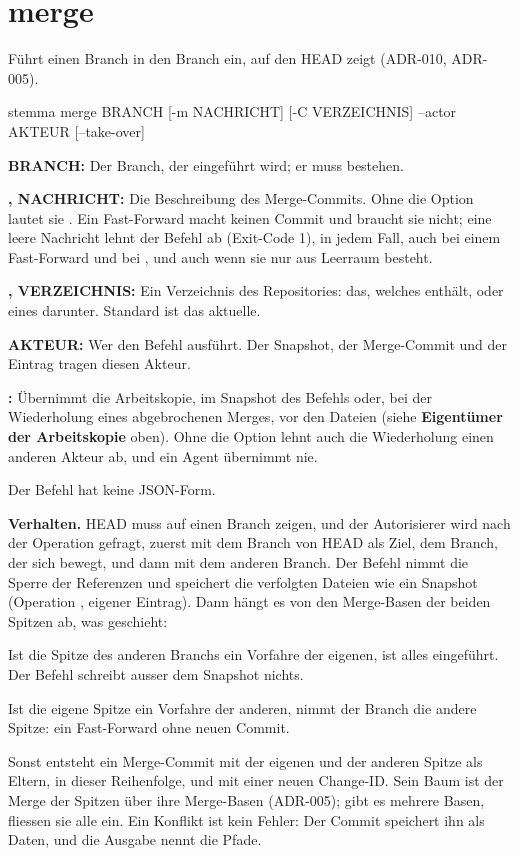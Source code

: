 \section{merge}

Führt einen Branch in den Branch ein, auf den HEAD zeigt (ADR-010, ADR-005).

\starttyping
stemma merge BRANCH [-m NACHRICHT] [-C VERZEICHNIS] --actor AKTEUR [--take-over]
\stoptyping

\startitemize
\item {\bf BRANCH:} Der Branch, der eingeführt wird; er muss bestehen.
\item {\bf {},  NACHRICHT:} Die Beschreibung des Merge-Commits.
Ohne die Option lautet sie .
Ein Fast-Forward macht keinen Commit und braucht sie nicht; eine leere Nachricht lehnt der Befehl
ab (Exit-Code 1), in jedem Fall, auch bei einem Fast-Forward und bei ,
und auch wenn sie nur aus Leerraum besteht.
\item {\bf {},  VERZEICHNIS:} Ein Verzeichnis des Repositories:
das, welches  enthält, oder eines darunter. Standard ist das aktuelle.
\item {\bf {} AKTEUR:} Wer den Befehl ausführt. Der Snapshot, der Merge-Commit und
der Eintrag tragen diesen Akteur.
\item {\bf {}:} Übernimmt die Arbeitskopie, im Snapshot des Befehls oder,
bei der Wiederholung eines abgebrochenen Merges, vor den Dateien
(siehe {\bf Eigentümer der Arbeitskopie} oben).
Ohne die Option lehnt auch die Wiederholung einen anderen Akteur ab, und ein Agent übernimmt nie.
\stopitemize

Der Befehl hat keine JSON-Form.

{\bf Verhalten.} HEAD muss auf einen Branch zeigen, und der Autorisierer wird nach der Operation
 gefragt, zuerst mit dem Branch von HEAD als Ziel, dem Branch, der sich bewegt,
und dann mit dem anderen Branch.
Der Befehl nimmt die Sperre der Referenzen und speichert die verfolgten Dateien wie ein Snapshot
(Operation , eigener Eintrag).
Dann hängt es von den Merge-Basen der beiden Spitzen ab, was geschieht:

\startitemize
\item Ist die Spitze des anderen Branchs ein Vorfahre der eigenen, ist alles eingeführt.
Der Befehl schreibt ausser dem Snapshot nichts.
\item Ist die eigene Spitze ein Vorfahre der anderen, nimmt der Branch die andere Spitze:
ein Fast-Forward ohne neuen Commit.
\item Sonst entsteht ein Merge-Commit mit der eigenen und der anderen Spitze als Eltern,
in dieser Reihenfolge, und mit einer neuen Change-ID.
Sein Baum ist der Merge der Spitzen über ihre Merge-Basen (ADR-005); gibt es mehrere Basen,
fliessen sie alle ein.
Ein Konflikt ist kein Fehler: Der Commit speichert ihn als Daten, und die Ausgabe nennt die Pfade.
\stopitemize

